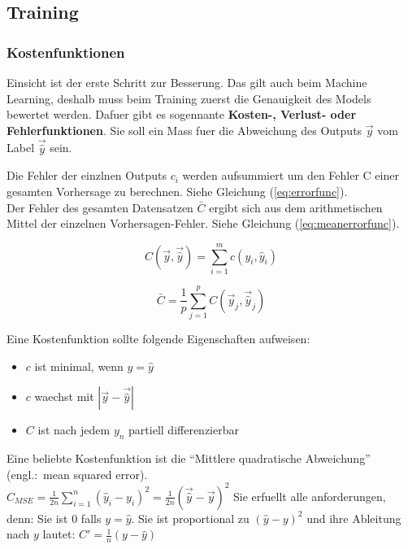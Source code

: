 \documentclass[../main]{subfiles}
\begin{document}
\subsection{Training}
\subsubsection{Kostenfunktionen}
Einsicht ist der erste Schritt zur Besserung. Das gilt auch beim Machine Learning, deshalb muss beim Training zuerst die Genauigkeit des Models bewertet werden.
Dafuer gibt es sogennante \textbf{Kosten-, Verlust- oder Fehlerfunktionen}. Sie soll ein Mass fuer die Abweichung des Outputs $\vec{y}$ vom Label $\vec{\hat{y}}$ sein.
\par\medskip
Die Fehler der einzlnen Outputs $c_i$ werden aufsummiert um den Fehler C einer gesamten Vorhersage zu berechnen. Siehe Gleichung (\ref{eq:errorfunc}).\\
Der Fehler des gesamten Datensatzen $\bar{C}$ ergibt sich aus dem arithmetischen
Mittel der einzelnen Vorhersagen-Fehler. Siehe Gleichung (\ref{eq:meanerrorfunc}).
\par\medskip
\begin{minipage}[h!]{0.5\textwidth}
  \centering
  \begin{equation}\label{eq:errorfunc}
    C \left(\vec{y},\vec{\hat{y}} \right)=\displaystyle\sum_{i=1}^{m} c(y_i, \hat{y}_i)
  \end{equation}
\end{minipage}
\begin{minipage}[h!]{0.5\textwidth}
  \centering
  \begin{equation}\label{eq:meanerrorfunc}
    \bar{C} = \frac{1}{p}\displaystyle\sum_{j=1}^{p} C\left(\vec{y}_j,\vec{\hat{y}}_j\right)
  \end{equation}
\end{minipage}
\par\medskip
Eine Kostenfunktion sollte folgende Eigenschaften aufweisen:
\begin{itemize}
\item{$c$ ist minimal, wenn $y = \hat{y}$}
\item{$c$ waechst mit $|\vec{y}-\vec{\hat{y}}|$}
\item{$C$ ist nach jedem $y_n$ partiell differenzierbar}
\end{itemize}

Eine beliebte Kostenfunktion ist die ``Mittlere quadratische Abweichung'' (engl.:\ mean squared error).\\
$\displaystyle C_{MSE} = \frac{1}{2n}\sum_{i=1}^{n}{(\hat{y}_i - y_i)}^2 = \frac{1}{2n}{(\vec{\hat{y}} - \vec{y})}^2$
Sie erfuellt alle anforderungen, denn:
Sie ist $0$ falls $y=\hat{y}$. Sie ist proportional zu ${(\hat{y}-y)}^2$ und ihre Ableitung nach $y$ lautet: $C'=\frac{1}{n}(y-\hat{y})$
\end{document}
